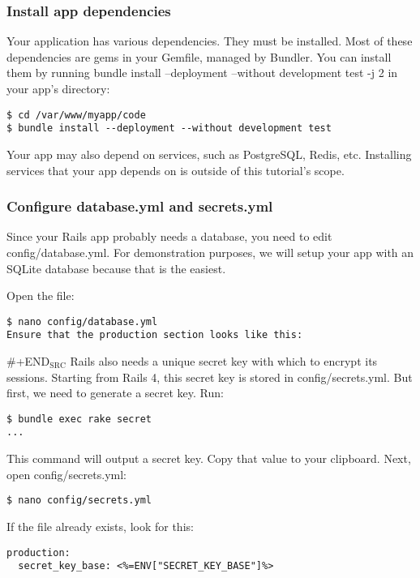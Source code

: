 \documentclass[11pt]{article}
\begin{document}
\subsubsection{Install app dependencies}
\label{sec:org5bf255a}

Your application has various dependencies. They must be installed. Most of these dependencies are gems in your Gemfile, managed by Bundler. You can install them by running bundle install --deployment --without development test -j 2 in your app's directory:

\begin{verbatim}
$ cd /var/www/myapp/code
$ bundle install --deployment --without development test
\end{verbatim}

Your app may also depend on services, such as PostgreSQL, Redis, etc. Installing services that your app depends on is outside of this tutorial's scope.

\subsubsection{Configure database.yml and secrets.yml}
\label{sec:org208a399}

Since your Rails app probably needs a database, you need to edit config/database.yml. For demonstration purposes, we will setup your app with an SQLite database because that is the easiest.

Open the file:
\begin{verbatim}
$ nano config/database.yml
Ensure that the production section looks like this:
\end{verbatim}


\#+END\(_{\text{SRC}}\)
Rails also needs a unique secret key with which to encrypt its sessions. Starting from Rails 4, this secret key is stored in config/secrets.yml. But first, we need to generate a secret key. Run:


\begin{verbatim}
$ bundle exec rake secret
...
\end{verbatim}
This command will output a secret key. Copy that value to your clipboard. Next, open config/secrets.yml:

\begin{verbatim}
$ nano config/secrets.yml
\end{verbatim}

If the file already exists, look for this:

\begin{verbatim}
production:
  secret_key_base: <%=ENV["SECRET_KEY_BASE"]%>
\end{verbatim}
\end{document}

